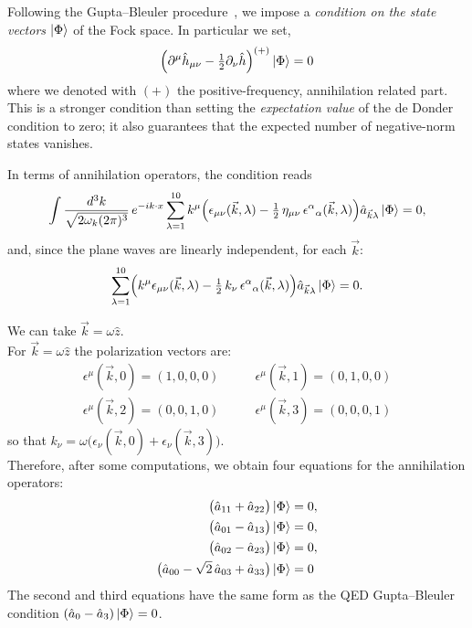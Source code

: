 \documentclass[12pt,a4paper,oneside]{article}
\numberwithin{equation}{section}   %
\begin{document}
Following the Gupta--Bleuler procedure~\cite{Gupta1952,GreinerFQ}, we impose a \textit{condition on the state
vectors} $\ket{\Phi}$ of the Fock space. In particular we set,
\begin{equation} \label{GPC1}
  \Bigl(\partial^\mu \hat{h}_{\mu\nu}
        - \tfrac{1}{2}\partial_\nu \hat{h}\Bigr)^{(+)} \ket{\Phi} = 0
\end{equation}
where we denoted with $(+)$ the positive-frequency, annihilation related part.
This is a stronger condition than setting the \textit{expectation value} of the de Donder
condition to zero; it also guarantees that the expected number of
negative-norm states vanishes.

In terms of annihilation operators, the condition reads
\begin{equation}
    \int \frac{d^3k}{\sqrt{2\omega_k(2\pi)^3}}\,e^{-ik\cdot x}\sum_{\lambda=1}^{10} k^\mu \Bigl(
         \epsilon_{\mu\nu}(\vec k,\lambda) -\tfrac12\, \eta_{\mu\nu}\, \epsilon^\alpha{}_\alpha(\vec k,\lambda)\Bigr)
    \hat{a}_{\vec{k}\lambda}\ket{\Phi} = 0 ,
\end{equation}
and, since the plane waves are linearly independent, for each $\vec k$:
\begin{equation}
    \sum_{\lambda=1}^{10}\Bigl(k^\mu \epsilon_{\mu\nu}(\vec k,\lambda) -\tfrac12\, k_\nu\, \epsilon^\alpha{}_\alpha(\vec k,\lambda)\Bigr)\hat a_{\vec k\lambda}\ket{\Phi} = 0 .
\end{equation}

We can take $\vec k=\omega\hat z$.\\
For $\vec k=\omega\hat z$ the polarization vectors are:
\begin{align}
\epsilon^\mu(\vec k,0)=(1,0,0,0)&\qquad
\epsilon^\mu(\vec k,1)=(0,1,0,0)\\
\epsilon^\mu(\vec k,2)=(0,0,1,0)&\qquad
\epsilon^\mu(\vec k,3)=(0,0,0,1)
\end{align}
so that
$k_\nu=\omega\bigl(\epsilon_\nu(\vec k,0)+\epsilon_\nu(\vec k,3)\bigr)$.\\
Therefore, after some computations,
 we obtain four equations for the
annihilation operators:
\begin{subequations}\label{GBE}
\begin{align}
\bigl(\hat a_{11}+\hat a_{22}\bigr)\ket{\Phi}&=0,\\
\bigl(\hat{a}_{01}-\hat{a}_{13}\bigr)\ket{\Phi} &=0,\\
\bigl(\hat{a}_{02}-\hat{a}_{23}\bigr)\ket{\Phi}&=0, \\
\bigl(\hat a_{00}-\sqrt2\,\hat a_{03}+\hat a_{33}\bigr)\ket{\Phi}&=0 
\end{align}
\end{subequations}
The second and third equations have the same form as the QED Gupta--Bleuler
condition $(\hat a_0-\hat a_3)\ket{\Phi}=0$.
\end{document}
